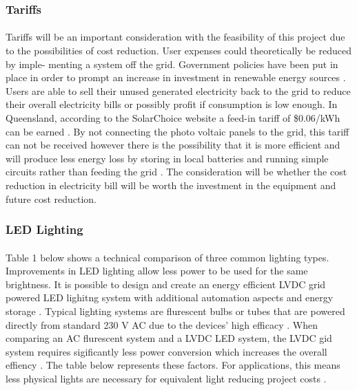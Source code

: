 \subsubsection{Tariffs}

\paragraph{}
Tariffs will be an important consideration with the feasibility of this project due to the
possibilities of cost reduction. User expenses could theoretically be reduced by imple-
menting a system off the grid. Government policies have been put in place in order
to prompt an increase in investment in renewable energy sources \cite{Nelson2011}. Users are able to sell their unused generated electricity back to the grid to reduce their overall electricity
bills or possibly profit if consumption is low enough. In Queensland, according to the
SolarChoice website a feed-in tariff of \$0.06/kWh can be earned \cite{website:SolarChoice}. By not connecting the photo voltaic panels to the grid, this tariff can not be received however there is the possibility that it is more efficient and will produce less energy loss by storing in local
batteries and running simple circuits rather than feeding the grid \cite{AntoniouATzimasARowland2015}. The consideration will be whether the cost reduction in electricity bill will be worth the investment in the equipment and future cost reduction.   

\subsubsection{LED Lighting}

\paragraph{}
Table 1 below shows a technical comparison of three common lighting types. Improvements in LED lighting allow less power to be used for the same brightness. It is possible to design and create an energy efficient LVDC grid powered LED lighitng system with additional automation aspects and energy storage \cite{Koh2011}. Typical lighting systems are flurescent bulbs or tubes that are powered directly from standard 230 V AC due to the devices' high efficacy \cite{Koh2011}. When comparing an AC flurescent system and a LVDC LED system, the LVDC gid system requires sigificantly less power conversion which increases the overall effiency \cite{Koh2011}. The table below represents these factors. For applications, this means less physical lights are necessary for equivalent light reducing project costs \cite{website:LED}.  

